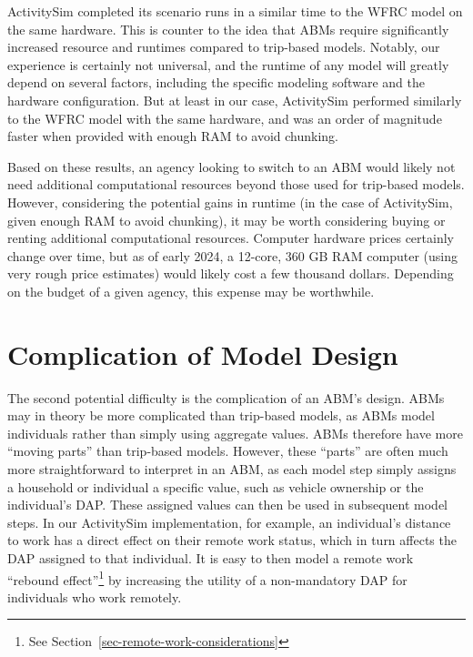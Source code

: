 \documentclass[fancy, oneside, mastersfancy, ms]{byuthesis}
\begin{document}
ActivitySim completed its scenario runs in a similar time to the WFRC
model on the same hardware. This is counter to the idea that ABMs
require significantly increased resource and runtimes compared to
trip-based models. Notably, our experience is certainly not universal,
and the runtime of any model will greatly depend on several factors,
including the specific modeling software and the hardware configuration.
But at least in our case, ActivitySim performed similarly to the WFRC
model with the same hardware, and was an order of magnitude faster when
provided with enough RAM to avoid chunking.

Based on these results, an agency looking to switch to an ABM would
likely not need additional computational resources beyond those used for
trip-based models. However, considering the potential gains in runtime
(in the case of ActivitySim, given enough RAM to avoid chunking), it may
be worth considering buying or renting additional computational
resources. Computer hardware prices certainly change over time, but as
of early 2024, a 12-core, 360 GB RAM computer (using very rough price
estimates) would likely cost a few thousand dollars. Depending on the
budget of a given agency, this expense may be worthwhile.

\section{Complication of Model
Design}\label{complication-of-model-design}

The second potential difficulty is the complication of an ABM's design.
ABMs may in theory be more complicated than trip-based models, as ABMs
model individuals rather than simply using aggregate values. ABMs
therefore have more ``moving parts'' than trip-based models. However,
these ``parts'' are often much more straightforward to interpret in an
ABM, as each model step simply assigns a household or individual a
specific value, such as vehicle ownership or the individual's DAP. These
assigned values can then be used in subsequent model steps. In our
ActivitySim implementation, for example, an individual's distance to
work has a direct effect on their remote work status, which in turn
affects the DAP assigned to that individual. It is easy to then model a
remote work ``rebound effect''\footnote{See
  Section~\ref{sec-remote-work-considerations}} by increasing the
utility of a non-mandatory DAP for individuals who work remotely.
\end{document}
